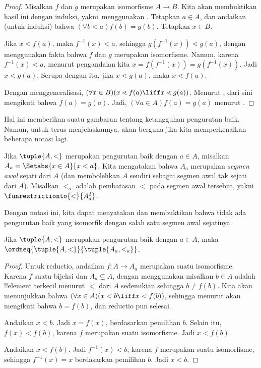 \documentclass[../../../include/open-logic-section]{subfiles}
\begin{document}
\begin{proof}
Misalkan $f$ dan $g$ merupakan isomorfisme $A \to B$. Kita akan membuktikan
hasil ini dengan induksi, yakni\ menggunakan .
Tetapkan $a\in A$, dan andaikan (untuk induksi) bahwa $(\forall b < a)f(b) =
g(b)$. Tetapkan $x \in B$.

Jika $x \lessdot f(a)$, maka $f^{-1}(x) < a$, sehingga
$g(f^{-1}(x)) \lessdot g(a)$, dengan menggunakan fakta bahwa $f$ dan $g$
merupakan isomorfisme. Namun, karena $f^{-1}(x) < a$, menurut pengandaian kita
$x =f(f^{-1}(x)) = g(f^{-1}(x))$. Jadi $x \lessdot g(a)$. Serupa dengan itu,
jika $x \lessdot g(a)$, maka $x \lessdot f(a)$.

Dengan menggeneralisasi, $(\forall x \in B)(x \lessdot f(a) \liff x
\lessdot g(a))$. Menurut
, dari sini
mengikuti bahwa $f(a) = g(a)$. Jadi, $(\forall a \in A)f(a) = g(a)$ menurut
.
\end{proof}\noindent
Hal ini memberikan suatu gambaran tentang ketangguhan pengurutan baik. Namun,
untuk terus menjelaskannya, akan berguna jika kita memperkenalkan beberapa
notasi lagi.

\begin{defn}
Jika $\tuple{A, <}$ merupakan pengurutan baik dengan $a \in A$, misalkan $A_a
= \Setabs{x \in A}{x < a}$. Kita mengatakan bahwa $A_a$ merupakan
\emph{segmen awal} sejati dari $A$ (dan membolehkan $A$ sendiri sebagai
segmen awal tak sejati dari $A$). Misalkan $<_a$ adalah pembatasan $<$ pada
segmen awal tersebut, yakni $\funrestrictionto{\mathord{<}}{A_a^2}$.
\end{defn}
\noindent
Dengan notasi ini, kita dapat menyatakan dan membuktikan bahwa tidak ada
pengurutan baik yang isomorfik dengan salah satu segmen awal sejatinya.

\begin{lem}
Jika $\tuple{A, <}$ merupakan pengurutan baik dengan $a \in A$, maka
$\ordneq{\tuple{A, <}}{\tuple{A_a, <_a}}$.
\end{lem}

\begin{proof}
Untuk reductio, andaikan $f \colon A \to A_a$ merupakan suatu isomorfisme.
Karena $f$ suatu bijeksi dan $A_a \subsetneq A$, dengan menggunakan
 misalkan $b \in A$ adalah !!{element} terkecil
menurut $<$ dari $A$ sedemikian sehingga $b \neq f(b)$. Kita akan menunjukkan
bahwa $(\forall x \in A)(x<b \liff x < f(b))$, sehingga menurut
 akan mengikuti
bahwa $b = f(b)$, dan reductio pun selesai.

Andaikan $x < b$. Jadi $x = f(x)$, berdasarkan pemilihan $b$. Selain itu,
$f(x) < f(b)$, karena $f$ merupakan suatu isomorfisme. Jadi $x < f(b)$.

Andaikan $x < f(b)$. Jadi $f^{-1}(x) < b$, karena $f$ merupakan suatu
isomorfisme, sehingga $f^{-1}(x) = x$ berdasarkan pemilihan $b$. Jadi $x <
b$.
\end{proof}
\end{document}
